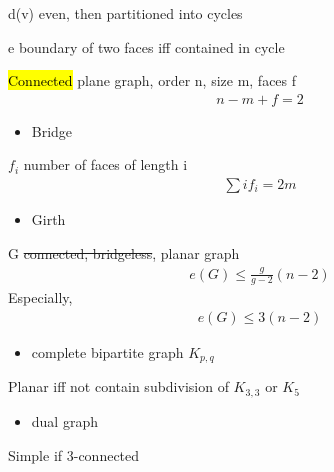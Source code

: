 \begin{lemma}
    d(v) even, then partitioned into cycles
\end{lemma}

\begin{lemma}
    e boundary of two faces iff contained in cycle
\end{lemma}

\begin{thm}[Euler]
    \hl{Connected} plane graph, order n, size m, faces f
    \begin{align*}
        n - m + f = 2
    \end{align*}
\end{thm}

\begin{itemize}
    \item Bridge
\end{itemize}
%
\begin{fact}
    $f_i$ number of faces of length i
    \begin{align*}
        \sum i f_i = 2m
    \end{align*}
\end{fact}

\begin{itemize}
    \item Girth
\end{itemize}

\begin{thm}
    G \st{connected, bridgeless}, planar graph
    \begin{align*}
        e(G) \leq \frac{g}{g-2}(n-2)
    \end{align*}
    Especially,
    \begin{align*}
        e(G) \leq 3(n -2)
    \end{align*}
\end{thm}

\begin{itemize}
    \item complete bipartite graph $K_{p,q}$
\end{itemize}

\begin{thm}[Kuratowski]
    Planar iff not contain subdivision of $K_{3,3}$ or $K_5$
\end{thm}

\begin{itemize}
    \item dual graph
\end{itemize}

\begin{fact}
    Simple if 3-connected
\end{fact}